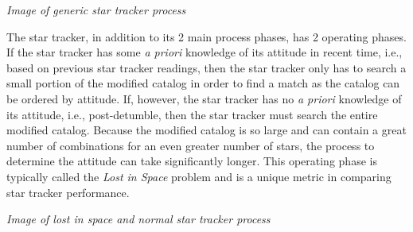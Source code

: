 \par \qquad \emph{Image of generic star tracker process}

\par \qquad The star tracker, in addition to its 2 main process phases, has 2 operating phases.
If the star tracker has some \emph{a priori} knowledge of its attitude in recent time, i.e., based on previous star tracker readings, then the star tracker only has to search a small portion of the modified catalog in order to find a match as the catalog can be ordered by attitude.
If, however, the star tracker has no \emph{a priori} knowledge of its attitude, i.e., post-detumble, then the star tracker must search the entire modified catalog.
Because the modified catalog is so large and can contain a great number of combinations for an even greater number of stars, the process to determine the attitude can take significantly longer.
This operating phase is typically called the \emph{Lost in Space} problem and is a unique metric in comparing star tracker performance.

\par \qquad \emph{Image of lost in space and normal star tracker process}